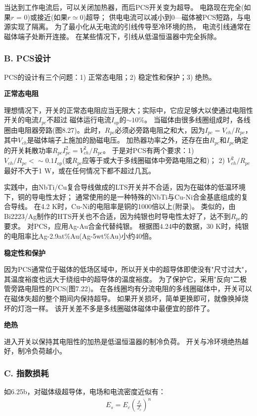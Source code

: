 当达到工作电流后，可以关闭加热器，而后PCS开关变为超导。
电路现在完全(如果$r$ = 0)或接近(如果$r\simeq 0$)超导；
供电电流可以减小到0---磁体被PCS短路，与电源实现了隔离。
为了最小化从无电流的引线传导至冷环境的热，
电流引线通常在磁体端子处断开连接。
 在某些情况下，引线从低温恒温器中完全拆除。

\subsubsection*{B. PCS设计}
PCS的设计有三个问题：1) 正常态电阻；2) 稳定性和保护；3) 绝热。

\textbf{正常态电阻}

理想情况下，开关的正常态电阻应当无限大；实际中，它应足够大以使通过电阻性开关的电流$I_{pc}$不超过
磁体运行电流$I_{op}$的$\sim 10\%$。
当磁体由很多线圈组成时，各线圈由电阻器旁路(图8.27)。此时，$R_{pc}$必须必旁路电阻之和大，因为$I_{pc}=V_{ch}/R_{pc}$，
其中$V_{ch}$是磁体端子上施加的励磁电压。
加热器功率之外，还存在由$R_{pc}$和$I_{pc}$确定的开关耗散功率$R_{pc}I_{pc}^2=V_{ch}^2/R_{pc}$。
于是对PCS有两个要求：1) $V_{ch}/R_{pc}<\sim 0.1 I_{op}$(或$R_{pc}$应等于或大于多线圈磁体中旁路电阻之和)；
2) $V_{ch}^2/R_{pc}$最好不大于1 W，或在任何情况下都不超过几瓦。

实践中，由NbTi/Cu复合导线做成的LTS开关并不合适，因为在磁体的低温环境下，铜的导电性太好；
通常使用的是一种特殊的NbTi与Cu-Ni合金基底组成的复合导线。
在4.2 K时，Cu-Ni的电阻率是铜的1000倍以上(附录)。
类似的，由Bi2223/Ag制作的HTS开关也不合适，因为纯银也时导电性太好了，达不到$R_{pc}$的要求。
对PCS，应用Ag-Au合金代替纯银。
根据图4.24中的数据，30 K时，纯银的电阻率比Ag-2.9at\%Au(Ag-5wt\%Au)小约40倍。

\textbf{稳定性和保护}

因为PCS通常位于磁体的低场区域中，所以开关中的超导体即使没有"尺寸过大"，
其温度裕度也远大于绕组中的超导体的温度裕度。
为了保护它，采用"反向"二极管旁路电阻性的PCS(图7.22)。
在各线圈均有分流电阻的多线圈磁体中，开关可以在磁体失超的整个期间内保持超导。
如果开关损坏，简单更换即可，就像换掉烧坏的灯泡一样。
该开关差不多是多线圈磁体磁体中最便宜的部件了。

\textbf{绝热}

进入开关以保持其电阻性的加热是低温恒温器的制冷负荷。
开关与冷环境绝热越好，制冷负荷越小。

\subsubsection*{C. 指数损耗}
如6.25b，对磁体级超导体，电场和电流密度近似有：
\begin{align*}%
E_s=E_c\left(\frac{J_s}{J_c}\right)^n \tag{6.25b}
\end{align*}

